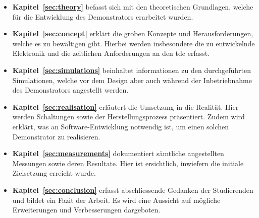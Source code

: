 \begin{itemize}
    \item \textbf{Kapitel~\ref{sec:theory}} befasst sich mit den theoretischen Grundlagen, welche für die Entwicklung des
          Demonstrators erarbeitet wurden.

    \item \textbf{Kapitel~\ref{sec:concept}} erklärt die groben Konzepte und Herausforderungen, welche es zu bewältigen gibt.
          Hierbei werden insbesondere die zu entwickelnde Elektronik und die zeitlichen Anforderungen an den \acrshort{tdc} erfasst.

    \item \textbf{Kapitel~\ref{sec:simulations}} beinhaltet informationen zu den durchgeführten Simulationen, welche vor
          dem Design aber auch während der Inbetriebnahme des Demonstrators angestellt werden.

    \item \textbf{Kapitel~\ref{sec:realisation}} erläutert die Umsetzung in die Realität. Hier werden Schaltungen sowie
          der Herstellungsprozess präsentiert. Zudem wird erklärt, was an Software-Entwicklung notwendig ist, um einen
          solchen Demonstrator zu realisieren.

    \item \textbf{Kapitel~\ref{sec:measurements}} dokumentiert sämtliche angestellten Messungen sowie deren Resultate. Hier
          ist ersichtlich, inwiefern die initiale Zielsetzung erreicht wurde.

    \item \textbf{Kapitel~\ref{sec:conclusion}} erfasst abschliessende Gedanken der Studierenden und bildet ein Fazit der Arbeit.
          Es wird eine Aussicht auf mögliche Erweiterungen und Verbesserungen dargeboten.
\end{itemize}
